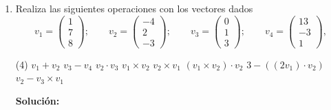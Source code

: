 \documentclass[12pt]{article}
\newenvironment{solucion}
{\begin{mdframed}[backgroundcolor=black!10]
		{\bf Solución:}\\
	}
	{
	\end{mdframed}
}
\newenvironment{preguntas}
{\begin{enumerate}\itemsep12pt
	}
	{
	\end{enumerate}
}
\begin{document}
\begin{preguntas}
\item Realiza las siguientes operaciones con los vectores dados
	$$
	v_1 = \begin{pmatrix}
	1\\
	7\\
	8
\end{pmatrix};\qquad
	v_2 = \begin{pmatrix}
	-4\\
	2\\
	-3
\end{pmatrix}; \qquad
	v_3 = \begin{pmatrix}
	0\\
	1\\
	3
\end{pmatrix}; \qquad
	v_4 = \begin{pmatrix}
	13\\
	-3\\
	1
\end{pmatrix},
	 $$
\begin{tasks}(4)
\task $v_1 + v_2$
\task $v_3 - v_4$
\task $v_2 \cdot v_3$
\task $v_1 \times v_2$
\task $v_2 \times v_1$
\task $(v_1 \times v_2) \cdot v_2$
\task $3 - ((2v_1) \cdot v_2)$
\task $v_2 - v_3 \times v_1$
\end{tasks}
\begin{solucion}


\end{solucion}
\end{preguntas}
\end{document}
